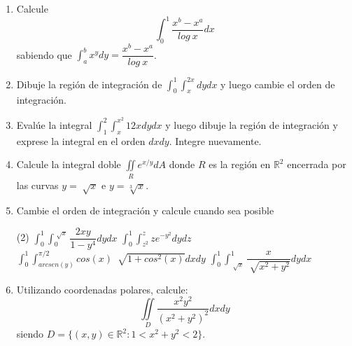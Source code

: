 \documentclass[12pt]{article}
\newenvironment{preguntas}
{\begin{enumerate}\itemsep12pt
	}
	{
	\end{enumerate}
}
\newcommand{\R}{\mathbb{R}}
\begin{document}
\begin{preguntas}
\begin{tasks}
\task $\displaystyle\int_2^4 \displaystyle\int_1^2 ye^{xy}dxdy$
\task $\displaystyle\int_{-1}^1\displaystyle\int_{-1}^1 \dfrac{xy}{1+x^2+y^2}dxdy$
\end{tasks}
\item Calcule
	$$ \displaystyle\int_0^1 \dfrac{x^b - x^a}{log\ x}dx$$
	sabiendo que $\displaystyle\int_a^b x^y dy = \dfrac{x^b - x^a}{log\ x}$.
\item Dibuje la región de integración de $\displaystyle\int_0^1 \displaystyle\int_x^{2x} dydx$ y luego cambie el orden de integración.
\item Evalúe la integral $\displaystyle\int_1^2 \displaystyle\int_x^{x^2} 12x dydx$ y luego dibuje la región de integración y exprese la integral en el orden $dxdy$. Integre nuevamente.
\item Calcule la integral doble $\displaystyle\iint\limits_R e^{x/y} dA$ donde $R$ es la región en $\R^2$ encerrada por las curvas $y=\sqrt[]{x}$ e $y=\sqrt[3]{x}$.
\item Cambie el orden de integración y calcule cuando sea posible
\begin{tasks}(2)
\task $\displaystyle\int_0^1 \displaystyle\int_0^{\sqrt[]{x}} \dfrac{2xy}{1-y^4} dydx$
\task $\displaystyle\int_0^1 \displaystyle\int_{z^2}^z ze^{-y^2} dydz$
\task $\displaystyle\int_0^1 \displaystyle\int_{arcsen(y)}^{\pi/2} cos(x)\ \sqrt[]{1+cos^2(x)} dxdy$
\task $\displaystyle\int_0^1 \displaystyle\int_{\sqrt[]{x}}^1 \dfrac{x}{\sqrt[]{x^2+y^2}} dydx$
\end{tasks}
\item Utilizando coordenadas polares, calcule:
	$$ \displaystyle\iint\limits_D \dfrac{x^2y^2}{(x^2+y^2)^2}dxdy $$
	siendo $D = \{ (x,y) \in \R^2 : 1 < x^2 + y^2 < 2\}$.
\end{preguntas}
\end{document}
